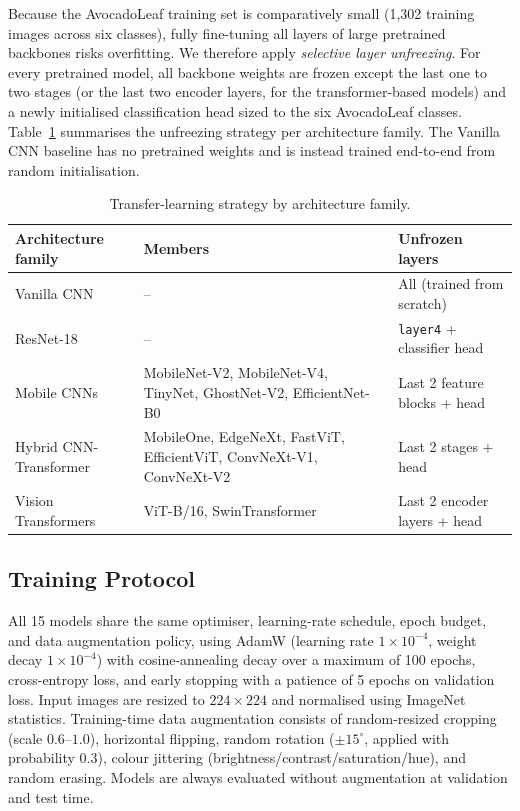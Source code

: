 Because the AvocadoLeaf training set is comparatively small (1,302 training images across six classes), fully fine-tuning all layers of large pretrained backbones risks overfitting. We therefore apply \emph{selective layer unfreezing}. For every pretrained model, all backbone weights are frozen except the last one to two stages (or the last two encoder layers, for the transformer-based models) and a newly initialised classification head sized to the six AvocadoLeaf classes. Table~\ref{tab:finetune_strategy} summarises the unfreezing strategy per architecture family. The Vanilla CNN baseline has no pretrained weights and is instead trained end-to-end from random initialisation.

\begin{table}[htbp]
\centering
\caption{Transfer-learning strategy by architecture family.}
\label{tab:finetune_strategy}
\small
\begin{tabularx}{\textwidth}{l X l}
\toprule
\textbf{Architecture family} & \textbf{Members} & \textbf{Unfrozen layers} \\
\midrule
Vanilla CNN & -- & All (trained from scratch) \\
ResNet-18 & -- & \texttt{layer4} + classifier head \\
Mobile CNNs & MobileNet-V2, MobileNet-V4, TinyNet, GhostNet-V2, EfficientNet-B0 & Last 2 feature blocks + head \\
Hybrid CNN-Transformer & MobileOne, EdgeNeXt, FastViT, EfficientViT, ConvNeXt-V1, ConvNeXt-V2 & Last 2 stages + head \\
Vision Transformers & ViT-B/16, SwinTransformer & Last 2 encoder layers + head \\
\bottomrule
\end{tabularx}
\end{table}

\subsection{Training Protocol}

All 15 models share the same optimiser, learning-rate schedule, epoch budget, and data augmentation policy, using AdamW (learning rate $1\times10^{-4}$, weight decay $1\times10^{-4}$) with cosine-annealing decay over a maximum of 100 epochs, cross-entropy loss, and early stopping with a patience of 5 epochs on validation loss. Input images are resized to $224\times224$ and normalised using ImageNet statistics. Training-time data augmentation consists of random-resized cropping (scale $0.6$–$1.0$), horizontal flipping, random rotation ($\pm15^\circ$, applied with probability 0.3), colour jittering (brightness/contrast/saturation/hue), and random erasing. Models are always evaluated without augmentation at validation and test time.

